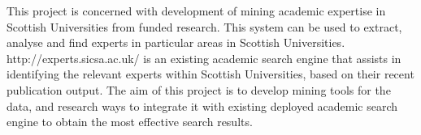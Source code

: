 This project is concerned with development of mining academic expertise in Scottish Universities from funded research.
This system can be used to extract, analyse and find experts in particular areas in Scottish Universities. 
http://experts.sicsa.ac.uk/ is an existing academic search engine 
that assists in identifying the relevant experts within Scottish Universities, based on their recent publication output. 
The aim of this project is to develop mining tools for the data, and research ways to integrate it with existing deployed academic search engine
to obtain the most effective search results.